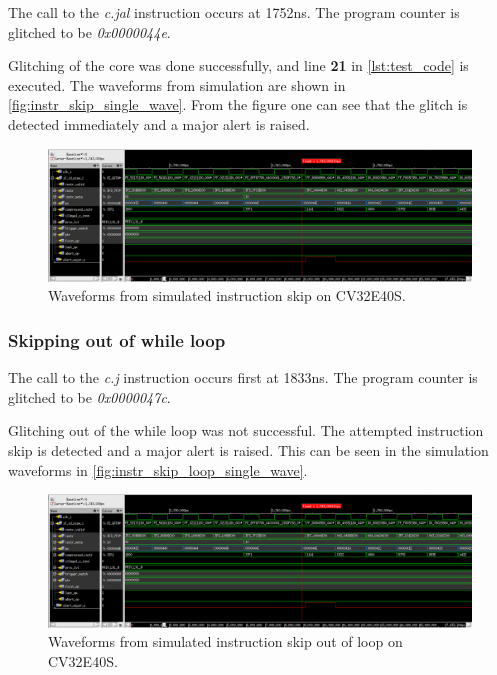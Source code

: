 The call to the \textit{c.jal} instruction occurs at 1752ns. The program counter is glitched to be \textit{0x0000044e}. 

Glitching of the core was done successfully, and line \textbf{21} in \autoref{lst:test_code} is executed. The waveforms from simulation are shown in \autoref{fig:instr_skip_single_wave}. From the figure one can see that the glitch is detected immediately and a major alert is raised. 

\begin{figure}[h!]
    \centering
    \includegraphics[width=\textwidth]{docs/images/instr_skip_glitch_injection_single_core.png}
    \caption{Waveforms from simulated instruction skip on CV32E40S.}
    \label{fig:instr_skip_single_wave}
\end{figure}

\subsubsection{Skipping out of while loop}

The call to the \textit{c.j} instruction occurs first at 1833ns. The program counter is glitched to be \textit{0x0000047c}.

Glitching out of the while loop was not successful. The attempted instruction skip is detected and a major alert is raised. This can be seen in the simulation waveforms in \autoref{fig:instr_skip_loop_single_wave}. 

\begin{figure}[h!]
    \centering
    \includegraphics[width=\textwidth]{docs/images/instr_skip_glitch_injection_single_core.png}
    \caption{Waveforms from simulated instruction skip out of loop on CV32E40S.}
    \label{fig:instr_skip_loop_single_wave}
\end{figure}

